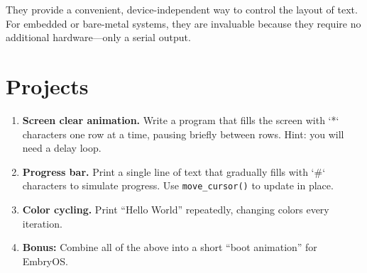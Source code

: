 They provide a convenient, device-independent way to control the layout of
text.  For embedded or bare-metal systems, they are invaluable because they
require no additional hardware—only a serial output.

\section*{Projects}

\begin{enumerate}
  \item \textbf{Screen clear animation.}
  Write a program that fills the screen with `*` characters one row at a time,
  pausing briefly between rows.  Hint: you will need a delay loop.
  \item \textbf{Progress bar.}
  Print a single line of text that gradually fills with `#` characters to
  simulate progress.  Use \texttt{move\_cursor()} to update in place.
  \item \textbf{Color cycling.}
  Print “Hello World” repeatedly, changing colors every iteration.
  \item \textbf{Bonus:}
  Combine all of the above into a short “boot animation” for EmbryOS.
\end{enumerate}
